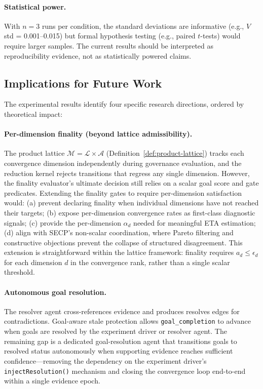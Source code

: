 \documentclass[11pt]{article}
\begin{document}
\paragraph{Statistical power.} With $n = 3$ runs per condition, the standard deviations are informative (e.g., $V$ std = 0.001--0.015) but formal hypothesis testing (e.g., paired $t$-tests) would require larger samples. The current results should be interpreted as reproducibility evidence, not as statistically powered claims.

\subsection{Implications for Future Work}

The experimental results identify four specific research directions, ordered by theoretical impact:

\paragraph{Per-dimension finality (beyond lattice admissibility).} The product lattice $\mathcal{M} = \mathcal{L} \times \mathcal{A}$ (Definition~\ref{def:product-lattice}) tracks each convergence dimension independently during governance evaluation, and the reduction kernel rejects transitions that regress any single dimension. However, the finality evaluator's ultimate decision still relies on a scalar goal score and gate predicates. Extending the finality gates to require per-dimension satisfaction would: (a) prevent declaring finality when individual dimensions have not reached their targets; (b) expose per-dimension convergence rates as first-class diagnostic signals; (c) provide the per-dimension $\alpha_d$ needed for meaningful ETA estimation; (d) align with SECP's non-scalar coordination, where Pareto filtering and constructive objections prevent the collapse of structured disagreement. This extension is straightforward within the lattice framework: finality requires $a_d \leq \epsilon_d$ for each dimension $d$ in the convergence rank, rather than a single scalar threshold.

\paragraph{Autonomous goal resolution.} The resolver agent cross-references evidence and produces resolves edges for contradictions. Goal-aware stale protection allows \texttt{goal\_completion} to advance when goals are resolved by the experiment driver or resolver agent. The remaining gap is a dedicated goal-resolution agent that transitions goals to resolved status autonomously when supporting evidence reaches sufficient confidence---removing the dependency on the experiment driver's \texttt{injectResolution()} mechanism and closing the convergence loop end-to-end within a single evidence epoch.
\end{document}

